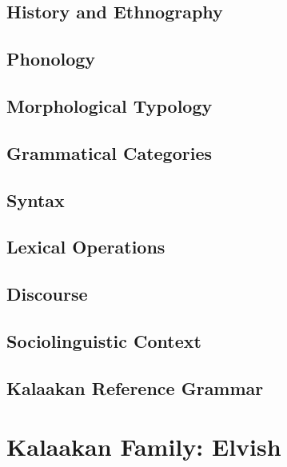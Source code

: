 \documentclass[12pt,letterpaper,openany,twoside]{memoir}
\let\originalpart=\part
\def\part{\cleardoublepage\originalpart}
\begin{document}
\chapter{History and Ethnography}

\chapter{Phonology}

\chapter{Morphological Typology}

\chapter{Grammatical Categories}

\chapter{Syntax}

\chapter{Lexical Operations}

\chapter{Discourse}

\chapter{Sociolinguistic Context}

\chapter{Kalaakan Reference Grammar}

\part{Kalaakan Family: Elvish}
\end{document}
